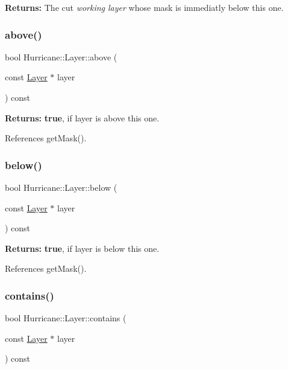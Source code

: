 {\bfseries Returns\+:} The cut {\itshape working layer} whose mask is immediatly below this one. \mbox{\label{classHurricane_1_1Layer_abbd13bf66cf75dd6445d0353987119f3}} 
\subsubsection{\texorpdfstring{above()}{above()}}
{\footnotesize\ttfamily bool Hurricane\+::\+Layer\+::above (\begin{DoxyParamCaption}\item[{const \mbox{\hyperlink{classHurricane_1_1Layer}{Layer}} $\ast$}]{layer }\end{DoxyParamCaption}) const\hspace{0.3cm}{\ttfamily [inline]}}

{\bfseries Returns\+:} {\bfseries true}, if {\ttfamily layer} is above this one. 

References get\+Mask().

\mbox{\label{classHurricane_1_1Layer_a090f8697946f721351a626052af25027}} 
\subsubsection{\texorpdfstring{below()}{below()}}
{\footnotesize\ttfamily bool Hurricane\+::\+Layer\+::below (\begin{DoxyParamCaption}\item[{const \mbox{\hyperlink{classHurricane_1_1Layer}{Layer}} $\ast$}]{layer }\end{DoxyParamCaption}) const\hspace{0.3cm}{\ttfamily [inline]}}

{\bfseries Returns\+:} {\bfseries true}, if {\ttfamily layer} is below this one. 

References get\+Mask().

\mbox{\label{classHurricane_1_1Layer_af63dd0a48e2a3514a1cdaccd4586bad8}} 
\subsubsection{\texorpdfstring{contains()}{contains()}}
{\footnotesize\ttfamily bool Hurricane\+::\+Layer\+::contains (\begin{DoxyParamCaption}\item[{const \mbox{\hyperlink{classHurricane_1_1Layer}{Layer}} $\ast$}]{layer }\end{DoxyParamCaption}) const}

